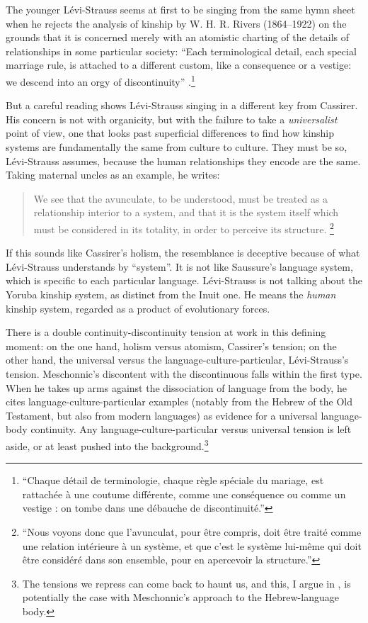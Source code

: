 \documentclass[output=paper]{langscibook}
\begin{document}
The younger Lévi-Strauss seems at first to be singing from the same hymn sheet when he rejects the analysis of kinship by W. H. R. Rivers (1864--1922) on the grounds that it is concerned merely with an atomistic charting of the details of relationships in some particular society: ``Each terminological detail, each special marriage rule, is attached to a different custom, like a consequence or a vestige: we descend into an orgy of discontinuity'' \citep[37]{LeviStrauss1945}.\footnote{``Chaque détail de terminologie, chaque règle spéciale du mariage, est rattachée à une coutume différente, comme une conséquence ou comme un vestige : on tombe dans une débauche de discontinuité.''}

But a careful reading shows Lévi-Strauss singing in a different key from Cassirer. His concern is not with organicity, but with the failure to take a \emph{universalist} point of view, one that looks past superficial differences to find how kinship systems are fundamentally the same from culture to culture. They must be so, Lévi-Strauss assumes, because the human relationships they encode are the same. Taking maternal uncles as an example, he writes:

\begin{quotation}
We see that the avunculate, to be understood, must be treated as a relationship interior to a system, and that it is the system itself which must be considered in its totality, in order to perceive its structure. \citep[47]{LeviStrauss1945}\footnote{``Nous voyons donc que l'avunculat, pour être compris, doit être traité comme une relation intérieure à un système, et que c'est le système lui-même qui doit être considéré dans son ensemble, pour en apercevoir la structure.''}
\end{quotation}

If this sounds like Cassirer's holism, the resemblance is deceptive because of what Lévi-Strauss understands by ``system''. It is not like Saussure's language system, which is specific to each particular language. Lévi-Strauss is not talking about the Yoruba kinship system, as distinct from the Inuit one. He means the \emph{human} kinship system, regarded as a product of evolutionary forces.

There is a double continuity-discontinuity tension at work in this defining  moment: on the one hand, holism versus atomism, Cassirer's tension; on the other hand, the universal versus the language-culture-particular, Lévi-Strauss's tension. Meschonnic's discontent with the discontinuous falls with\-in the first type. When he takes up arms against the  dissociation of language from the body, he cites language-culture-particular examples (notably from the Hebrew of the Old Testament, but also from modern languages) as evidence for a universal language-body continuity. Any language-culture-particular versus universal tension is left aside, or at least pushed into the background.\footnote{The tensions we repress can come back to haunt us, and this, I argue in \citet{Joseph2018languagebody}, is potentially the case with Meschonnic's approach to the Hebrew-language body.} 
\end{document}
